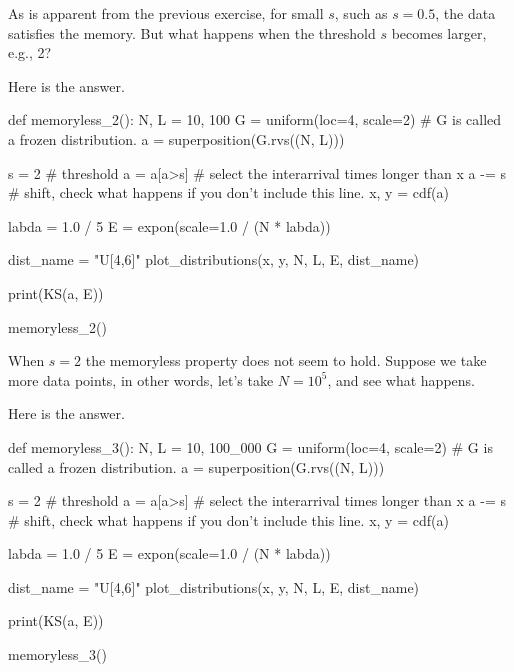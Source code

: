 \begin{exercise}
  As is apparent from the previous exercise, for small $s$, such as $s=0.5$, the data satisfies the memory.
But   what happens when  the threshold $s$ becomes larger, e.g., 2?
  \begin{solution}
Here is the answer.
\begin{pyverbatim}
def memoryless_2():
    N, L = 10, 100
    G = uniform(loc=4, scale=2)  # G is called a frozen distribution.
    a = superposition(G.rvs((N, L)))

    s = 2 # threshold
    a = a[a>s] # select the interarrival times longer than x
    a -= s  # shift, check what happens if you don't include this line.
    x, y = cdf(a)

    labda = 1.0 / 5
    E = expon(scale=1.0 / (N * labda))

    dist_name = "U[4,6]"
    plot_distributions(x, y, N, L, E, dist_name)

    print(KS(a, E))

memoryless_2()

\end{pyverbatim}
  \end{solution}
\end{exercise}

\begin{exercise}
When $s=2$ the memoryless property does not seem to hold. Suppose we take more data points, in other words, let's take $N=10^5$, and see what happens.
  \begin{solution}
Here is the answer.
\begin{pyverbatim}
def memoryless_3():
    N, L = 10, 100_000
    G = uniform(loc=4, scale=2)  # G is called a frozen distribution.
    a = superposition(G.rvs((N, L)))

    s = 2 # threshold
    a = a[a>s] # select the interarrival times longer than x
    a -= s  # shift, check what happens if you don't include this line.
    x, y = cdf(a)

    labda = 1.0 / 5
    E = expon(scale=1.0 / (N * labda))

    dist_name = "U[4,6]"
    plot_distributions(x, y, N, L, E, dist_name)

    print(KS(a, E))

memoryless_3()

\end{pyverbatim}
  \end{solution}
\end{exercise}


